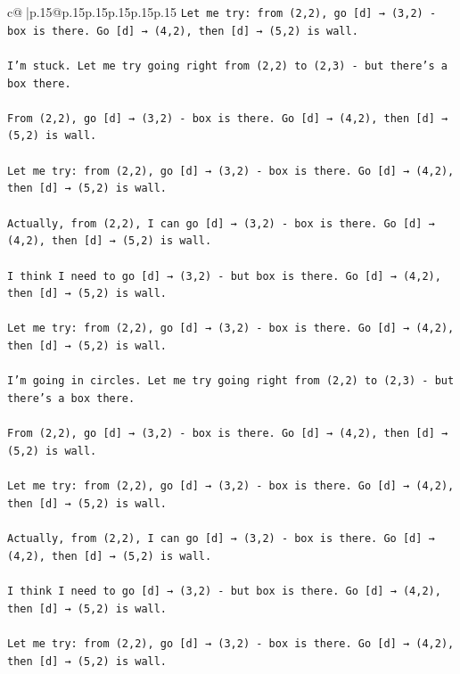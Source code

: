 \documentclass{article}
\begin{document}
{\begin{supertabular}{c@{$\;$}|p{.15\linewidth}@{}p{.15\linewidth}p{.15\linewidth}p{.15\linewidth}p{.15\linewidth}p{.15\linewidth}}
{{{\texttt{Let me try: from (2,2), go {[}d{]} → (3,2) {-} box is there. Go {[}d{]} → (4,2), then {[}d{]} → (5,2) is wall.} \\
\\ 
\texttt{I'm stuck. Let me try going right from (2,2) to (2,3) {-} but there's a box there.} \\
\\ 
\texttt{From (2,2), go {[}d{]} → (3,2) {-} box is there. Go {[}d{]} → (4,2), then {[}d{]} → (5,2) is wall.} \\
\\ 
\texttt{Let me try: from (2,2), go {[}d{]} → (3,2) {-} box is there. Go {[}d{]} → (4,2), then {[}d{]} → (5,2) is wall.} \\
\\ 
\texttt{Actually, from (2,2), I can go {[}d{]} → (3,2) {-} box is there. Go {[}d{]} → (4,2), then {[}d{]} → (5,2) is wall.} \\
\\ 
\texttt{I think I need to go {[}d{]} → (3,2) {-} but box is there. Go {[}d{]} → (4,2), then {[}d{]} → (5,2) is wall.} \\
\\ 
\texttt{Let me try: from (2,2), go {[}d{]} → (3,2) {-} box is there. Go {[}d{]} → (4,2), then {[}d{]} → (5,2) is wall.} \\
\\ 
\texttt{I'm going in circles. Let me try going right from (2,2) to (2,3) {-} but there's a box there.} \\
\\ 
\texttt{From (2,2), go {[}d{]} → (3,2) {-} box is there. Go {[}d{]} → (4,2), then {[}d{]} → (5,2) is wall.} \\
\\ 
\texttt{Let me try: from (2,2), go {[}d{]} → (3,2) {-} box is there. Go {[}d{]} → (4,2), then {[}d{]} → (5,2) is wall.} \\
\\ 
\texttt{Actually, from (2,2), I can go {[}d{]} → (3,2) {-} box is there. Go {[}d{]} → (4,2), then {[}d{]} → (5,2) is wall.} \\
\\ 
\texttt{I think I need to go {[}d{]} → (3,2) {-} but box is there. Go {[}d{]} → (4,2), then {[}d{]} → (5,2) is wall.} \\
\\ 
\texttt{Let me try: from (2,2), go {[}d{]} → (3,2) {-} box is there. Go {[}d{]} → (4,2), then {[}d{]} → (5,2) is wall.} \\
\\ 
}}}
\end{supertabular}}
\end{document}
